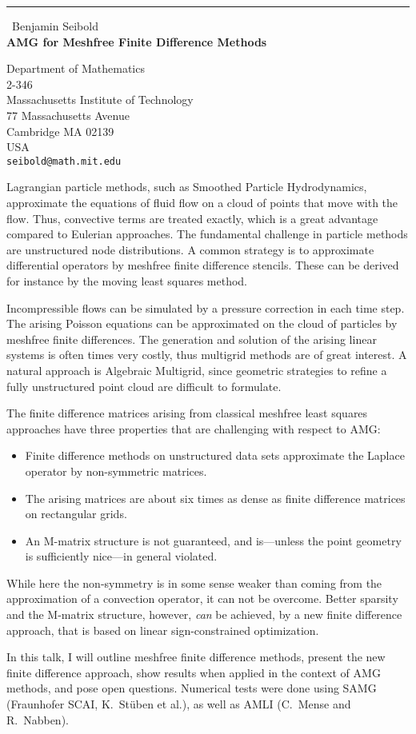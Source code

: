 \documentclass{report}
\begin{document}
\begin{center}
\rule{6in}{1pt} \
{\large Benjamin Seibold \\
{\bf AMG for Meshfree Finite Difference Methods}}

Department of Mathematics \\ 2-346 \\ Massachusetts Institute of Technology \\ 77 Massachusetts Avenue \\ Cambridge MA 02139 \\ USA
\\
{\tt seibold@math.mit.edu}\end{center}

Lagrangian particle methods, such as Smoothed Particle
Hydrodynamics, approximate the equations of fluid flow
on a cloud of points that move with the flow. Thus,
convective terms are treated exactly, which is a great
advantage compared to Eulerian approaches. The
fundamental challenge in particle methods are
unstructured node distributions. A common strategy is to
approximate differential operators by meshfree finite
difference stencils. These can be derived for instance
by the moving least squares method.

Incompressible flows can be simulated by a pressure
correction in each time step. The arising Poisson
equations can be approximated on the cloud of particles
by meshfree finite differences. The generation and
solution of the arising linear systems is often times
very costly, thus multigrid methods are of great
interest. A natural approach is Algebraic Multigrid,
since geometric strategies to refine a fully
unstructured point cloud are difficult to formulate.

The finite difference matrices arising from classical
meshfree least squares approaches have three properties
that are challenging with respect to AMG:
\begin{itemize}
\item
Finite difference methods on unstructured data sets
approximate the Laplace operator by non-symmetric
matrices.
\item
The arising matrices are about six times as dense as
finite difference matrices on rectangular grids.
\item
An M-matrix structure is not guaranteed, and is---unless
the point geometry is sufficiently nice---in general
violated.
\end{itemize}
While here the non-symmetry is in some sense weaker than
coming from the approximation of a convection operator,
it can not be overcome.
Better sparsity and the M-matrix structure, however,
\emph{can} be achieved, by a new finite difference
approach, that is based on linear sign-constrained
optimization.

In this talk, I will outline meshfree finite difference
methods, present the new finite difference approach, show
results when applied in the context of AMG methods, and
pose open questions. Numerical tests were done using
SAMG (Fraunhofer SCAI, K.~St{\"u}ben et al.),
as well as AMLI (C.~Mense and R.~Nabben).
\end{document}
